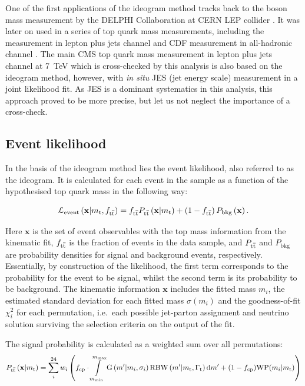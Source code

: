 One of the first applications of the ideogram method tracks back to the \W boson mass measurement by the \textsc{DELPHI}
Collaboration at CERN LEP collider \autocite{DELPHI_1998, DELPHI_2008}. It was later on used in a series of top quark
mass measurements, including the \Dzero measurement in lepton plus jets channel \autocite{D0_top_mass_ljets_ideogram}
and CDF measurement in all-hadronic channel \autocite{CDF_ideogram}. The main CMS top quark mass measurement in lepton
plus jets channel at \SI{7}{\TeV} \autocite{top_mass_ljets_CMS} which is cross-checked by this analysis is also based on
the ideogram method, however, with \textit{in situ} JES (jet energy scale) measurement in a joint likelihood fit. As JES
is a dominant systematics in this analysis, this approach proved to be more precise, but let us not neglect the
importance of a cross-check.

\subsection{Event likelihood}
\label{ss_top_mass:event_likelihood}
In the basis of the ideogram method lies the event likelihood, also referred to as the ideogram. It is calculated for
each event in the sample as a function of the hypothesised top quark mass \mtop in the following way:

\begin{equation}
\mathcal{L}_\textrm{event} \left(\mathbf{x}|m_\mathrm{t}, f_{\mathrm{t}\overline{\mathrm{t}}} \right) = f_{\mathrm{t}\overline{\mathrm{t}}} P_{\mathrm{t}\overline{\mathrm{t}}}
\left(\mathbf{x}|m_\mathrm{t}\right) + \left(1 - f_{\mathrm{t}\overline{\mathrm{t}}} \right)P_\textrm{bkg}\left(\mathbf{x}\right).
\label{eq:event_likelihood}
\end{equation}

Here $\mathbf{x}$ is the set of event observables with the top mass information from the kinematic fit, $f_{\mathrm{t}\overline{\mathrm{t}}}$ is
the fraction of \ttbar events in the data sample, and $P_{\mathrm{t}\overline{\mathrm{t}}}$ and $P_\textrm{bkg}$ are probability densities for
signal and background events, respectively. Essentially, by construction of the likelihood, the first term corresponds
to the probability for the event to be signal, whilst the second term is its probability to be background. The kinematic
information $\mathbf{x}$ includes the fitted mass $m_{i}$, the estimated standard deviation for each fitted mass
$\sigma(m_{i})$ and the goodness-of-fit $\chi^{2}_{i}$ for each permutation, i.e.\ each possible jet-parton assignment
and neutrino solution surviving the selection criteria on the output of the fit.

The \ttbar signal probability is calculated as a weighted sum over all permutations:
\begin{equation}
P_{\mathrm{t}\overline{\mathrm{t}}}\left(\mathbf{x}|m_\mathrm{t}\right) = \sum_{i}^{24} w_{i} \left( f_{\textrm{cp}} \cdot
\int\limits^{m_{\textrm{max}}}_{m_{\textrm{min}}} \textrm{G}\left(m'|m_{i},\sigma_{i}\right) \textrm{RBW}
\left(m'|m_\mathrm{t},\Gamma_{\textrm{t}}\right) \textrm{d}m' + (1 - f_{\textrm{cp}})\textrm{WP}(m_{i}|m_\mathrm{t})\right)
\end{equation}


